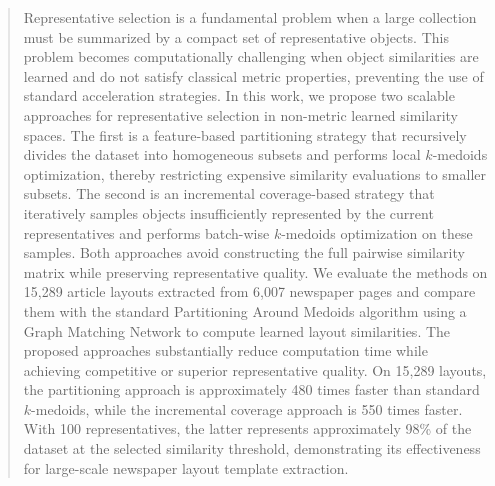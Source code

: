 \documentclass{ieeeaccess}
\begin{document}
\begin{abstract}
Representative selection is a fundamental problem when a large collection must be summarized by a compact set of representative objects. This problem becomes computationally challenging when object similarities are learned and do not satisfy classical metric properties, preventing the use of standard acceleration strategies. In this work, we propose two scalable approaches for representative selection in non-metric learned similarity spaces. The first is a feature-based partitioning strategy that recursively divides the dataset into homogeneous subsets and performs local $k$-medoids optimization, thereby restricting expensive similarity evaluations to smaller subsets. The second is an incremental coverage-based strategy that iteratively samples objects insufficiently represented by the current representatives and performs batch-wise $k$-medoids optimization on these samples. Both approaches avoid constructing the full pairwise similarity matrix while preserving representative quality. We evaluate the methods on 15,289 article layouts extracted from 6,007 newspaper pages and compare them with the standard Partitioning Around Medoids algorithm using a Graph Matching Network to compute learned layout similarities. The proposed approaches substantially reduce computation time while achieving competitive or superior representative quality. On 15,289 layouts, the partitioning approach is approximately 480 times faster than standard $k$-medoids, while the incremental coverage approach is 550 times faster. With 100 representatives, the latter represents approximately 98\% of the dataset at the selected similarity threshold, demonstrating its effectiveness for large-scale newspaper layout template extraction.

\end{abstract}
\end{document}
